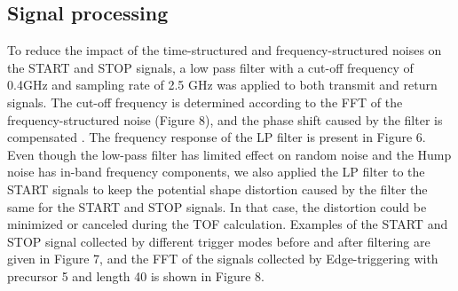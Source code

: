 \subsection{Signal processing}
To reduce the impact of the time-structured and frequency-structured noises on the START and STOP signals, a low pass filter with a cut-off frequency of 0.4GHz and sampling rate of 2.5 GHz was applied to both transmit and return signals. The cut-off frequency is determined according to the FFT of the frequency-structured noise (Figure 8), and the phase shift caused by the filter is compensated . The frequency response of the LP filter is present in Figure 6.  
Even though the low-pass filter has limited effect on random noise and the Hump noise has in-band frequency components, we also applied the LP filter to the START signals to keep the potential shape distortion caused by the filter the same for the START and STOP signals. In that case, the distortion could be minimized or canceled during the TOF calculation. Examples of the START and STOP signal collected by different trigger modes before and after filtering are given in Figure 7, and the FFT of the signals collected by Edge-triggering with precursor 5 and length 40 is shown in Figure 8.



